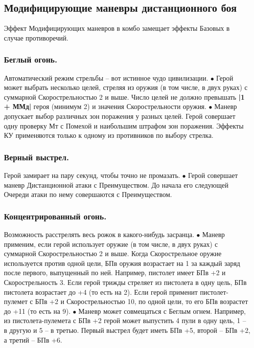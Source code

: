 \subsection{Модифицирующие маневры дистанционного боя}
Эффект Модифицирующих маневров в комбо замещает эффекты Базовых в случае противоречий.

\subsubsection{Беглый огонь.}
\tbd Автоматический режим стрельбы – вот истинное чудо цивилизации.
$\bullet$ Герой может выбрать несколько целей, стреляя из оружия (в том числе, в двух руках) с суммарной Скорострельностью 2 и выше. Число целей не должно превышать \textbf{|1 + ММд|} героя (минимум 2) и значения Скорострельности оружия. 
\newline $\bullet$ Маневр допускает выбор различных зон поражения у разных целей. Герой совершает одну проверку Мт с Помехой и наибольшим штрафом зон поражения. Эффекты КУ применяются только к одному из противников по выбору стрелка.

\subsubsection{Верный выстрел.}
Герой замирает на пару секунд, чтобы точно не промазать.
$\bullet$ Герой совершает маневр Дистанционной атаки с Преимуществом. До начала его следующей Очереди атаки по нему совершаются с Преимуществом. 

\subsubsection{Концентрированный огонь.}
Возможность расстрелять весь рожок в какого-нибудь засранца.
$\bullet$ Маневр применим, если герой использует оружие (в том числе, в двух руках) с суммарной Скорострельностью 2 и выше. Когда Скорострельное оружие используется против одной цели, БПв оружия возрастает на 1 за каждый заряд после первого, выпущенный по ней. 
\newline Например, пистолет имеет БПв +2 и Скорострельность 3. Если герой трижды стреляет из пистолета в одну цель, БПв пистолета возрастает до +4 (то есть на 2). Если герой применит пистолет-пулемет с БПв +2 и Скорострельностью 10, по одной цели, то его БПв возрастет до +11 (то есть на 9).
\newline $\bullet$ Маневр может совмещаться с Беглым огнем. Например, из пистолета-пулемета с БПв +2 герой может выпустить 4 пули в одну цель,  1 – в другую и 5 – в третью. Первый выстрел будет иметь БПв +5, второй – БПв +2, а третий – БПв +6.

